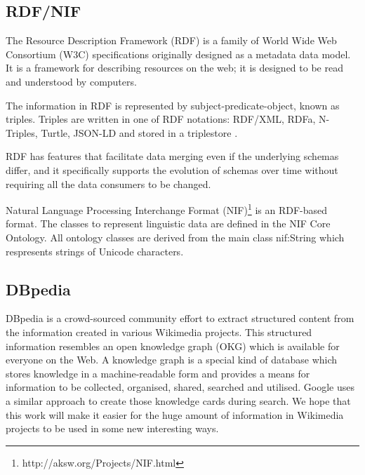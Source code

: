\documentclass[thesis=M,english]{FITthesis}[2018/05/30]
\begin{document}
\subsection{RDF/NIF}
	The Resource Description Framework (RDF)\cite{wiki:RDF} is a family of World Wide Web Consortium (W3C) specifications originally designed as a metadata data model.  It is a framework for describing resources on the web; it is designed to be read and understood by computers.
	
	The information in RDF is represented by subject-predicate-object, known as triples. Triples are written in one of RDF notations: RDF/XML, RDFa, N-Triples, Turtle, JSON-LD and stored in a triplestore \cite{master:SPARQL}.
	
	
	RDF \cite{w3c:RDF} has features that facilitate data merging even if the underlying schemas differ, and it specifically supports the evolution of schemas over time without requiring all the data consumers to be changed.

	Natural Language Processing Interchange Format (NIF)\footnote{http://aksw.org/Projects/NIF.html} \cite{w3c:NIF} is an RDF-based format. The classes to represent linguistic data are defined in the NIF Core Ontology. All ontology classes are derived from the main class nif:String which respresents strings of Unicode characters.

\subsection{DBpedia}
DBpedia \cite{dbpedia:core} is a crowd-sourced community effort to extract structured content from the information created in various Wikimedia projects. This structured information resembles an open knowledge graph (OKG) which is available for everyone on the Web. A knowledge graph is a special kind of database which stores knowledge in a machine-readable form and provides a means for information to be collected, organised, shared, searched and utilised. Google uses a similar approach to create those knowledge cards during search. We hope that this work will make it easier for the huge amount of information in Wikimedia projects to be used in some new interesting ways. 
\end{document}
